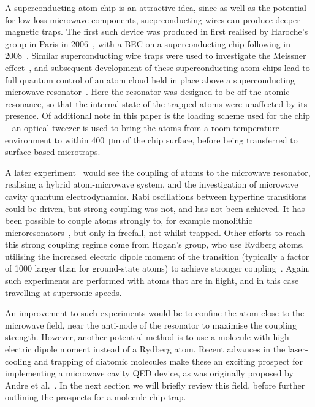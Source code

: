 A superconducting atom chip is an attractive idea, since as well as the
potential for low-loss microwave components, sueprconducting wires can produce
deeper magnetic traps. The first such device was produced in first realised by
Haroche's group in Paris in 2006~\cite{Nirrengarten2006}, with a BEC on a
superconducting chip following in 2008~\cite{Roux2008}. Similar superconducting
wire traps were used to investigate the Meissner
effect~\cite{PhysRevLett.101.183006}, and subsequent development of these
superconducting atom chips lead to full quantum control of an atom cloud held
in place above a superconducting microwave resonator~\cite{Bernon2013}. Here
the resonator was designed to be off the atomic resonance, so that the internal
state of the trapped atoms were unaffected by its presence. Of additional note
in this paper is the loading scheme used for the chip -- an optical tweezer is
used to bring the atoms from a room-temperature environment to within
\SI{400}{\micro\meter} of the chip surface, before being transferred to
surface-based microtraps.

A later experiment~\cite{Hattermann2017} would see the coupling of atoms to the
microwave resonator, realising a hybrid atom-microwave system, and the
investigation of microwave cavity quantum electrodynamics. Rabi oscillations
between hyperfine transitions could be driven, but strong coupling was not, and
has not been achieved. It has been possible to couple atoms strongly to, for
example monolithic microresonators~\cite{Aoki2006}, but only in freefall, not whilst
trapped. Other efforts to reach this strong coupling regime come from Hogan's
group, who use Rydberg atoms, utilising the increased electric dipole moment of
the transition (typically a factor of 1000 larger than for ground-state atoms)
to achieve stronger coupling~\cite{PhysRevLett.124.193604}. Again, such
experiments are performed with atoms that are in flight, and in this case
travelling at supersonic speeds.

An improvement to such experiments would be to confine the atom close to the
microwave field, near the anti-node of the resonator to maximise the coupling
strength. However, another potential method is to use a molecule with high
electric dipole moment instead of a Rydberg atom. Recent advances in the
laser-cooling and trapping of diatomic molecules make these an exciting
prospect for implementing a microwave cavity QED device, as was originally
proposed by Andre et al.~\cite{Andre2006}. In the next section we will briefly
review this field, before further outlining the prospects for a molecule chip
trap.

